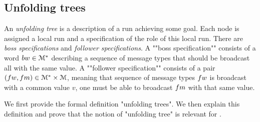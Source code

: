 \subsection{Unfolding trees}
\label{sec:decidability-tree-unfoldings}

An \emph{unfolding tree} is a description of a run achieving some goal. Each node is assigned a local run and a specification of the role of this local run. There are \emph{boss specifications} and \emph{follower specifications}. A ""boss specification"" consists of a word $\bossspec \in \messages^*$ describing a sequence of message types that should be broadcast all with the same value. A ""follower specification"" consists of a pair $(\followwordspec, \followmessagespec) \in \messages^*\times \messages$, meaning that sequence of message types $\followwordspec$ is broadcast with a common value $v$, one must be able to broadcast $\followmessagespec$ with that same value. 

We first provide the formal definition "unfolding trees". We then explain this definition and prove that the notion of "unfolding tree" is relevant for \COVER. 

